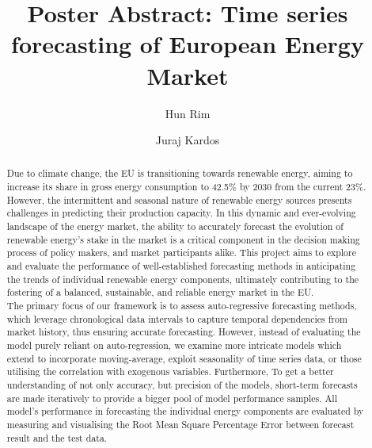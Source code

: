 \documentclass[acmtog]{acmart}
\begin{document}
\title{Poster Abstract: Time series forecasting of European Energy Market
}

\author{Hun Rim}
\author{Juraj Kardos}
\authornotemark[1]

\begin{abstract}
Due to climate change, the EU is transitioning towards renewable energy, aiming to increase its share in gross energy consumption to 42.5\% by 2030 from the current 23\%. However, the intermittent and seasonal nature of renewable energy sources presents challenges in predicting their production capacity. In this dynamic and ever-evolving landscape of the energy market, the ability to accurately forecast the evolution of renewable energy’s stake in the market is a critical component in the decision making process of policy makers, and market participants alike. This project aims to explore and evaluate the performance of well-established forecasting methods in anticipating the trends of individual renewable energy components, ultimately contributing to the fostering of a balanced, sustainable, and reliable energy market in the EU. \\

The primary focus of our framework is to assess auto-regressive forecasting methods, which leverage chronological data intervals to capture temporal dependencies from market history, thus ensuring accurate forecasting. However, instead of evaluating the model purely reliant on auto-regression, we examine more intricate models which extend to incorporate moving-average, exploit seasonality of time series data, or those utilising the correlation with exogenous variables. Furthermore, To get a better understanding of not only accuracy, but precision of the models, short-term forecasts are made iteratively to provide a bigger pool of model performance samples. All model’s performance in forecasting the individual energy components are evaluated by measuring and visualising the  Root Mean Square Percentage Error between forecast result and the test data. \\



\end{abstract}
\end{document}
